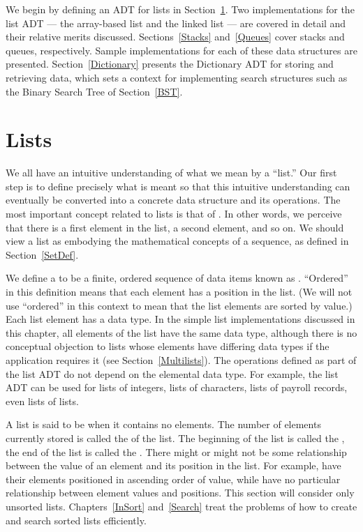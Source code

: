 We begin by defining an ADT for
lists in Section~\ref{Lists}.
Two implementations for the list ADT --- the array-based
list and the linked
list --- are covered in
detail and their relative merits discussed.
Sections~\ref{Stacks} and~\ref{Queues} cover stacks and queues,
respectively.
Sample implementations for each of these data structures are presented.
Section~\ref{Dictionary} presents the Dictionary ADT for storing and
retrieving data, which sets a context for implementing search
structures such as the Binary Search Tree of Section~\ref{BST}.

\newpage

\section{Lists}
\label{Lists}

We all have an intuitive understanding of what we mean by a ``list.''
Our first step is to define precisely what is meant so that
this intuitive understanding can eventually be converted into a
concrete data structure and its operations.
The most important concept related to lists is that of
.
In other words, we perceive that there is a first element in the list,
a second element, and so on.
We should view a list as embodying the mathematical concepts of
a sequence, as defined in Section~\ref{SetDef}.

We define a  to be a finite, ordered
sequence of data items known as
.
``Ordered'' in this definition means that each element has a
position in the list.
(We will not use ``ordered'' in this context to mean that the list
elements are sorted by value.)
Each list element has a data type.
In the simple list implementations discussed in this chapter, all
elements of the list have the same data type, although there is
no conceptual objection to lists whose elements have differing
data types if the application requires it (see
Section~\ref{Multilists}).
The operations defined as part of the list ADT do not
depend on the elemental data type.
For example, the list ADT can be used for lists of integers, lists of
characters, lists of payroll records, even lists of lists.

A list is said to be  when it
contains no elements.
The number of elements currently stored is called the
 of the list.
The beginning of the list is called the
, the end of the
list is called the .
There might or might not be some relationship between the value of an
element and its position in the list.
For example,  have
their elements positioned in ascending order of value, while
 have no
particular relationship between element values and positions.
This section will consider only unsorted lists.
Chapters~\ref{InSort} and~\ref{Search} treat the problems of how
to create and search sorted lists efficiently.

